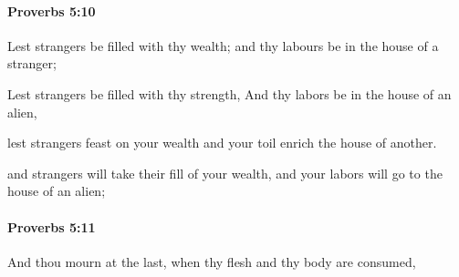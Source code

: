 		\paragraph{Proverbs 5:10} %
			\label{PROVERBS-5-10}

			Lest strangers be filled with thy wealth; and thy labours be in the house of a stranger;

			\begin{versebox}
					\item[BHS] 
					\item[ASV] Lest strangers be filled with thy strength, And thy labors be in the house of an alien,
					\item[NIV] lest strangers feast on your wealth and your toil enrich the house of another.
					\item[NRSV] and strangers will take their fill of your wealth, and your labors will go to the house of an alien;
			\end{versebox}

		\paragraph{Proverbs 5:11} %
			\label{PROVERBS-5-11}

			And thou mourn at the last, when thy flesh and thy body are consumed,

